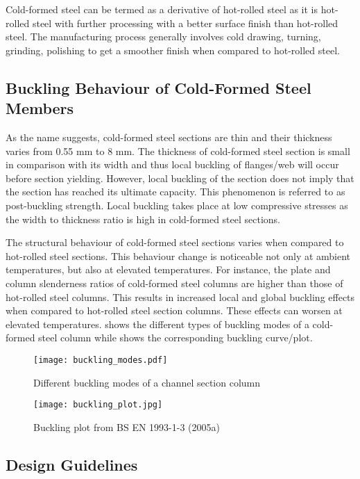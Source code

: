 Cold-formed steel can be termed as a derivative of hot-rolled steel as it is hot-rolled steel with further processing with a better surface finish than hot-rolled steel. The manufacturing process generally involves cold drawing, turning, grinding, polishing to get a smoother finish when compared to hot-rolled steel.

\subsection{Buckling Behaviour of Cold-Formed Steel Members}

As the name suggests, cold-formed steel sections are thin and their thickness varies from 0.55 mm to 8 mm. The thickness of cold-formed steel section is small in comparison with its width and thus local buckling of flanges/web will occur before section yielding. However, local buckling of the section does not imply that the section has reached its ultimate capacity. This phenomenon is referred to as post-buckling strength. Local buckling takes place at low compressive stresses as the width to thickness ratio is high in cold-formed steel sections.

The structural behaviour of cold-formed steel sections varies when compared to hot-rolled steel sections. This behaviour change is noticeable not only at ambient temperatures, but also at elevated temperatures. For instance, the plate and column slenderness ratios of cold-formed steel columns are higher than those of hot-rolled steel columns. This results in increased local and global buckling effects when compared to hot-rolled steel section columns. These effects can worsen at elevated temperatures.  shows the different types of buckling modes of a cold-formed steel column while  shows the corresponding buckling curve/plot. 
\begin{figure}[htbp]
	\centering	
		\texttt{[image: buckling\_modes.pdf]}
		\caption{Different buckling modes of a channel section column}
		\label{fig:buckling_modes}
\end{figure}
\begin{figure}[htbp]
	\centering	
		\texttt{[image: buckling\_plot.jpg]}
		\caption{Buckling plot from BS EN 1993-1-3 (2005a)}
		\label{fig:buckling_plot}
\end{figure}

\subsection{Design Guidelines}

